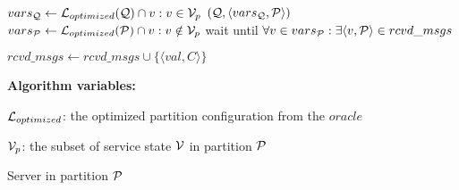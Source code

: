 \begin{algorithm}[htbp!]
\begin{distribalgo}[1]
\vspace{1.0mm}
		\STATE $vars_{\mathcal{Q}} \leftarrow \mathcal{L}_{optimized}(\mathcal{Q}) \cap v:v \in \mathcal{V}_p$
		\STATE \rmcast$(\mathcal{Q}, \langle vars_{\mathcal{Q}}, \mathcal{P} \rangle )$
	\ENDFOR
	\STATE $vars_{\mathcal{P}} \leftarrow \mathcal{L}_{optimized}(\mathcal{P}) \cap v:v \notin \mathcal{V}_p$
	\STATE wait until $\forall v \in vars_{\mathcal{P}}: \exists \langle v, \mathcal{P} \rangle \in rcvd\_msgs$
\ENDINDENT

\vspace{1.0mm}
    \STATE $rcvd\_msgs \leftarrow rcvd\_msgs \cup \{\langle val, C \rangle\}$
\ENDINDENT

\vspace{1.5mm}

\textbf{Algorithm variables:}

\vspace{1mm}

$\mathcal{L}_{optimized}$: the optimized partition configuration from the $oracle$

$\mathcal{V}_p$: the subset of service state $\mathcal{V}$ in partition $\mathcal{P}$


\caption{Server in partition $\mathcal{P}$}
\label{alg:dynastar-server_proxy}
\end{distribalgo}
\end{algorithm}
